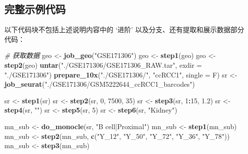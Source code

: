 \documentclass[
]{article}
\newenvironment{Shaded}{\begin{snugshade}}{\end{snugshade}}
\newcommand{\CommentTok}[1]{\textcolor[rgb]{0.56,0.35,0.01}{\textit{#1}}}
\newcommand{\DataTypeTok}[1]{\textcolor[rgb]{0.13,0.29,0.53}{#1}}
\newcommand{\DecValTok}[1]{\textcolor[rgb]{0.00,0.00,0.81}{#1}}
\newcommand{\FloatTok}[1]{\textcolor[rgb]{0.00,0.00,0.81}{#1}}
\newcommand{\KeywordTok}[1]{\textcolor[rgb]{0.13,0.29,0.53}{\textbf{#1}}}
\newcommand{\NormalTok}[1]{#1}
\newcommand{\OperatorTok}[1]{\textcolor[rgb]{0.81,0.36,0.00}{\textbf{#1}}}
\newcommand{\StringTok}[1]{\textcolor[rgb]{0.31,0.60,0.02}{#1}}
\begin{document}
\hypertarget{ux5b8cux6574ux793aux4f8bux4ee3ux7801}{%
\subsection{完整示例代码}\label{ux5b8cux6574ux793aux4f8bux4ee3ux7801}}

以下代码块不包括上述说明内容中的 `进阶' 以及分支、还有提取和展示数据部分代码：

\begin{Shaded}
\begin{Highlighting}[]
\CommentTok{\# 获取数据}
\NormalTok{geo \textless{}{-}}\StringTok{ }\KeywordTok{job\_geo}\NormalTok{(}\StringTok{"GSE171306"}\NormalTok{)}
\NormalTok{geo \textless{}{-}}\StringTok{ }\KeywordTok{step1}\NormalTok{(geo)}
\NormalTok{geo \textless{}{-}}\StringTok{ }\KeywordTok{step2}\NormalTok{(geo)}
\KeywordTok{untar}\NormalTok{(}\StringTok{"./GSE171306/GSE171306\_RAW.tar"}\NormalTok{, }\DataTypeTok{exdir =} \StringTok{"./GSE171306"}\NormalTok{)}
\KeywordTok{prepare\_10x}\NormalTok{(}\StringTok{"./GSE171306/"}\NormalTok{, }\StringTok{"ccRCC1"}\NormalTok{, }\DataTypeTok{single =}\NormalTok{ F)}
\NormalTok{sr \textless{}{-}}\StringTok{ }\KeywordTok{job\_seurat}\NormalTok{(}\StringTok{"./GSE171306/GSM5222644\_ccRCC1\_barcodes"}\NormalTok{)}

\NormalTok{sr \textless{}{-}}\StringTok{ }\KeywordTok{step1}\NormalTok{(sr)}
\NormalTok{sr \textless{}{-}}\StringTok{ }\KeywordTok{step2}\NormalTok{(sr, }\DecValTok{0}\NormalTok{, }\DecValTok{7500}\NormalTok{, }\DecValTok{35}\NormalTok{)}
\NormalTok{sr \textless{}{-}}\StringTok{ }\KeywordTok{step3}\NormalTok{(sr, }\DecValTok{1}\OperatorTok{:}\DecValTok{15}\NormalTok{, }\FloatTok{1.2}\NormalTok{)}
\NormalTok{sr \textless{}{-}}\StringTok{ }\KeywordTok{step4}\NormalTok{(sr, }\StringTok{""}\NormalTok{)}
\NormalTok{sr \textless{}{-}}\StringTok{ }\KeywordTok{step5}\NormalTok{(sr, }\DecValTok{5}\NormalTok{)}
\NormalTok{sr \textless{}{-}}\StringTok{ }\KeywordTok{step6}\NormalTok{(sr, }\StringTok{"Kidney"}\NormalTok{)}

\NormalTok{mn\_sub \textless{}{-}}\StringTok{ }\KeywordTok{do\_monocle}\NormalTok{(sr, }\StringTok{"B cell|Proximal"}\NormalTok{)}
\NormalTok{mn\_sub \textless{}{-}}\StringTok{ }\KeywordTok{step1}\NormalTok{(mn\_sub)}
\NormalTok{mn\_sub \textless{}{-}}\StringTok{ }\KeywordTok{step2}\NormalTok{(mn\_sub, }\KeywordTok{c}\NormalTok{(}\StringTok{"Y\_12"}\NormalTok{, }\StringTok{"Y\_50"}\NormalTok{, }\StringTok{"Y\_72"}\NormalTok{, }\StringTok{"Y\_36"}\NormalTok{, }\StringTok{"Y\_78"}\NormalTok{))}
\NormalTok{mn\_sub \textless{}{-}}\StringTok{ }\KeywordTok{step3}\NormalTok{(mn\_sub)}


\end{Highlighting}
\end{Shaded}
\end{document}

